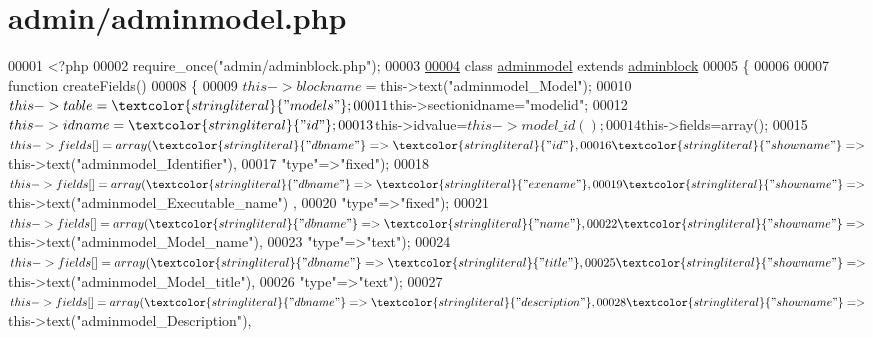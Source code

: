 \hypertarget{adminmodel_8php_source}{\section{admin/adminmodel.php}
}

\begin{DoxyCode}
00001 <?php
00002 require\_once(\textcolor{stringliteral}{"admin/adminblock.php"});
00003 
\hypertarget{adminmodel_8php_source_l00004}{}\hyperlink{classadminmodel}{00004} \textcolor{keyword}{class }\hyperlink{classadminmodel}{adminmodel} \textcolor{keyword}{extends} \hyperlink{classadminblock}{adminblock}
00005 \{  
00006 
00007   \textcolor{keyword}{function} createFields()
00008   \{
00009     $this->blockname=$this->text(\textcolor{stringliteral}{"adminmodel\_Model"});
00010     $this->table=\textcolor{stringliteral}{"models"};
00011     $this->sectionidname=\textcolor{stringliteral}{"modelid"};
00012     $this->idname=\textcolor{stringliteral}{"id"};
00013     $this->idvalue=$this->model\_id();
00014     $this->fields=array();
00015     $this->fields[]=array(\textcolor{stringliteral}{"dbname"}=>\textcolor{stringliteral}{"id"},
00016                           \textcolor{stringliteral}{"showname"}=>$this->text(\textcolor{stringliteral}{"adminmodel\_Identifier"}),
00017                           \textcolor{stringliteral}{"type"}=>\textcolor{stringliteral}{"fixed"});
00018     $this->fields[]=array(\textcolor{stringliteral}{"dbname"}=>\textcolor{stringliteral}{"exename"},
00019                           \textcolor{stringliteral}{"showname"}=>$this->text(\textcolor{stringliteral}{"adminmodel\_Executable\_name"})
      ,
00020                           \textcolor{stringliteral}{"type"}=>\textcolor{stringliteral}{"fixed"});
00021     $this->fields[]=array(\textcolor{stringliteral}{"dbname"}=>\textcolor{stringliteral}{"name"},
00022                           \textcolor{stringliteral}{"showname"}=>$this->text(\textcolor{stringliteral}{"adminmodel\_Model\_name"}),
00023                           \textcolor{stringliteral}{"type"}=>\textcolor{stringliteral}{"text"});
00024     $this->fields[]=array(\textcolor{stringliteral}{"dbname"}=>\textcolor{stringliteral}{"title"},
00025                           \textcolor{stringliteral}{"showname"}=>$this->text(\textcolor{stringliteral}{"adminmodel\_Model\_title"}),
00026                           \textcolor{stringliteral}{"type"}=>\textcolor{stringliteral}{"text"});
00027     $this->fields[]=array(\textcolor{stringliteral}{"dbname"}=>\textcolor{stringliteral}{"description"},
00028                           \textcolor{stringliteral}{"showname"}=>$this->text(\textcolor{stringliteral}{"adminmodel\_Description"}),

\end{DoxyCode}
